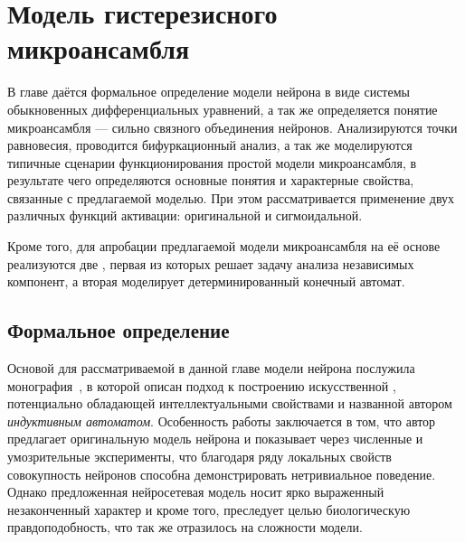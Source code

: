 \chapter{Модель гистерезисного микроансамбля} \label{chapter:neuron}

В главе даётся формальное определение модели нейрона в виде системы обыкновенных дифференциальных уравнений, а так же определяется понятие микроансамбля --- сильно связного объединения нейронов. Анализируются точки равновесия, проводится бифуркационный анализ, а так же моделируются типичные сценарии функционирования простой модели микроансамбля, в результате чего определяются основные понятия и характерные свойства, связанные с предлагаемой моделью. При этом рассматривается применение двух различных функций активации: оригинальной и сигмоидальной. 

Кроме того, для апробации предлагаемой модели микроансамбля на её основе реализуются две , первая из которых решает задачу анализа независимых компонент, а вторая моделирует детерминированный конечный автомат. 


\section{Формальное определение} \label{section:neuron_model}

Основой для рассматриваемой в данной главе модели нейрона послужила монография~\cite{EmelyanovYaroslavsky1990}, в которой описан подход к построению искусственной , потенциально обладающей интеллектуальными свойствами и названной автором \textit{индуктивным автоматом}. Особенность работы заключается в том, что автор предлагает оригинальную модель нейрона и показывает через численные и умозрительные эксперименты, что благодаря ряду локальных свойств совокупность нейронов способна демонстрировать нетривиальное поведение. Однако предложенная нейросетевая модель носит ярко выраженный незаконченный характер и кроме того, преследует целью биологическую правдоподобность, что так же отразилось на сложности модели.

